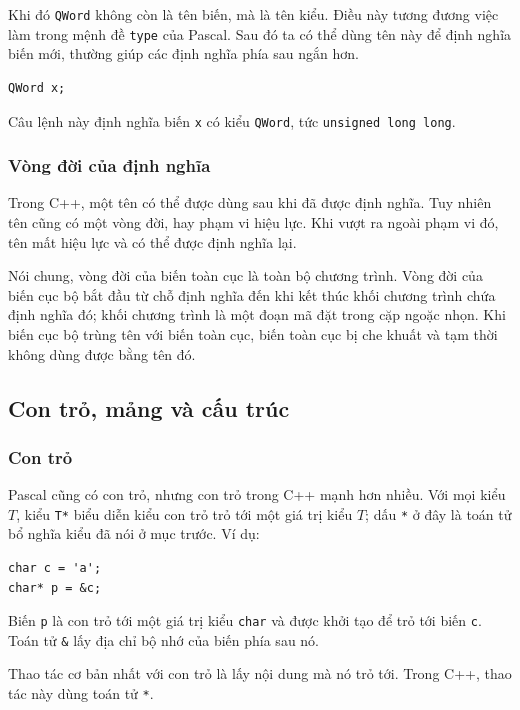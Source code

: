 \documentclass[11pt]{article}
\newcommand{\cpp}{C++}
\newcommand{\pascal}{Pascal}
\begin{document}
Khi đó \verb|QWord| không còn là tên biến, mà là tên kiểu. Điều này tương
đương việc làm trong mệnh đề \verb|type| của \pascal{}. Sau đó ta có thể dùng
tên này để định nghĩa biến mới, thường giúp các định nghĩa phía sau ngắn hơn.

\begin{verbatim}
QWord x;
\end{verbatim}

Câu lệnh này định nghĩa biến \verb|x| có kiểu \verb|QWord|, tức
\verb|unsigned long long|.

\subsubsection*{Vòng đời của định nghĩa}

Trong \cpp{}, một tên có thể được dùng sau khi đã được định nghĩa. Tuy nhiên
tên cũng có một vòng đời, hay phạm vi hiệu lực. Khi vượt ra ngoài phạm vi đó,
tên mất hiệu lực và có thể được định nghĩa lại.

Nói chung, vòng đời của biến toàn cục là toàn bộ chương trình. Vòng đời của
biến cục bộ bắt đầu từ chỗ định nghĩa đến khi kết thúc khối chương trình chứa
định nghĩa đó; khối chương trình là một đoạn mã đặt trong cặp ngoặc nhọn. Khi
biến cục bộ trùng tên với biến toàn cục, biến toàn cục bị che khuất và tạm
thời không dùng được bằng tên đó.

\subsection{Con trỏ, mảng và cấu trúc}

\subsubsection*{Con trỏ}

\pascal{} cũng có con trỏ, nhưng con trỏ trong \cpp{} mạnh hơn nhiều. Với mọi
kiểu \(T\), kiểu \verb|T*| biểu diễn kiểu con trỏ trỏ tới một giá trị kiểu
\(T\); dấu \verb|*| ở đây là toán tử bổ nghĩa kiểu đã nói ở mục trước. Ví dụ:

\begin{verbatim}
char c = 'a';
char* p = &c;
\end{verbatim}

Biến \verb|p| là con trỏ tới một giá trị kiểu \verb|char| và được khởi tạo để
trỏ tới biến \verb|c|. Toán tử \verb|&| lấy địa chỉ bộ nhớ của biến phía sau
nó.

Thao tác cơ bản nhất với con trỏ là lấy nội dung mà nó trỏ tới. Trong \cpp{},
thao tác này dùng toán tử \verb|*|.
\end{document}
